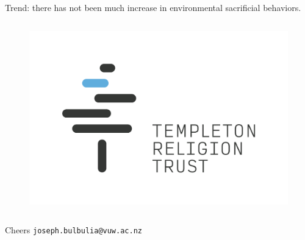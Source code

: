\documentclass{beamer}
\begin{document}
\begin{frame}{Trend: there has not been much increase in environmental sacrificial behaviors.}
\begin{frame}
\begin{columns}
\centering
\begin{figure}
\includegraphics[width=\textwidth,height=\textheight,keepaspectratio]{TRT_LOGO.png}
\end{figure}
\end{columns}
\end{frame}


\begin{frame}{Cheers}
\centering
\texttt{joseph.bulbulia@vuw.ac.nz}
\end{frame}





\end{frame}
\end{document}
